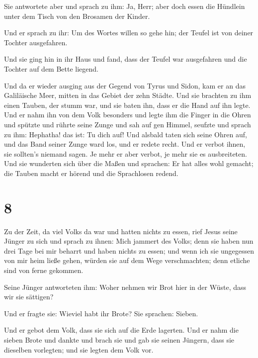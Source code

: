  Sie antwortete aber und sprach zu ihm: Ja, Herr; aber
doch essen die Hündlein unter dem Tisch von den Brosamen der Kinder.

 Und er sprach zu ihr: Um des Wortes willen so gehe hin;
der Teufel ist von deiner Tochter ausgefahren.

 Und sie ging hin in ihr Haus und fand, dass der Teufel
war ausgefahren und die Tochter auf dem Bette liegend.

 Und da er wieder ausging aus der Gegend von Tyrus und
Sidon, kam er an das Galiläische Meer, mitten in das Gebiet der zehn
Städte.  Und sie brachten zu ihm einen Tauben, der stumm
war, und sie baten ihn, dass er die Hand auf ihn legte. 
Und er nahm ihn von dem Volk besonders und legte ihm die Finger in die
Ohren und spützte und rührte seine Zunge  und sah auf gen
Himmel, seufzte und sprach zu ihm: Hephatha! das ist: Tu dich auf!
 Und alsbald taten sich seine Ohren auf, und das Band
seiner Zunge ward los, und er redete recht.  Und er
verbot ihnen, sie sollten's niemand sagen. Je mehr er aber verbot, je
mehr sie es ausbreiteten.  Und sie wunderten sich über
die Maßen und sprachen: Er hat alles wohl gemacht; die Tauben macht er
hörend und die Sprachlosen redend.

\hypertarget{section-7}{%
\section{8}\label{section-7}}

 Zu der Zeit, da viel Volks da war und hatten nichts zu
essen, rief Jesus seine Jünger zu sich und sprach zu ihnen:
 Mich jammert des Volks; denn sie haben nun drei Tage bei
mir beharrt und haben nichts zu essen;  und wenn ich sie
ungegessen von mir heim ließe gehen, würden sie auf dem Wege
verschmachten; denn etliche sind von ferne gekommen.

 Seine Jünger antworteten ihm: Woher nehmen wir Brot hier
in der Wüste, dass wir sie sättigen?

 Und er fragte sie: Wieviel habt ihr Brote? Sie sprachen:
Sieben.

 Und er gebot dem Volk, dass sie sich auf die Erde
lagerten. Und er nahm die sieben Brote und dankte und brach sie und gab
sie seinen Jüngern, dass sie dieselben vorlegten; und sie legten dem
Volk vor.

